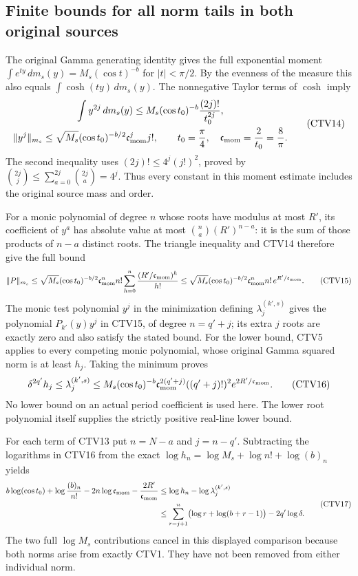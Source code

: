 \documentclass[11pt,a4paper]{article}
\begin{document}
\subsection{Finite bounds for all norm tails in both original sources}

The original Gamma generating identity gives the full exponential
moment
$\int e^{t y}\,dm_s(y)=M_s(\cos t)^{-b}$ for
$|t|<\pi/2$. By the evenness of the measure this also equals
$\int\cosh(t y)\,dm_s(y)$.
The nonnegative Taylor terms of $\cosh$ imply
\[
 \begin{gathered}
 \int y^{2j}\,dm_s(y)
  \le M_s(\cos t_0)^{-b}\frac{(2j)!}{t_0^{2j}},\\
 \|y^j\|_{m_s}
  \le\sqrt{M_s}(\cos t_0)^{-b/2}\mathfrak c_{\rm mom}^j j!,\qquad
 t_0=\frac\pi4,\quad \mathfrak c_{\rm mom}=\frac2{t_0}=\frac8\pi .
 \end{gathered}\tag{CTV14}
\]
The second inequality uses
$(2j)!\le4^j(j!)^2$, proved by
$\binom{2j}{j}\le\sum_{a=0}^{2j}\binom{2j}{a}=4^j$.
Thus every constant in this moment estimate includes the
original source mass and order.

For a monic polynomial of degree $n$ whose roots have modulus
at most $R'$, its coefficient of $y^a$ has absolute value at most
$\binom na(R')^{n-a}$: it is the sum of those products of
$n-a$ distinct roots. The triangle inequality and CTV14 therefore
give the full bound
\[
 \|P\|_{m_s}
  \le\sqrt{M_s}(\cos t_0)^{-b/2}
          \mathfrak c_{\rm mom}^n n!\sum_{h=0}^n
                              \frac{(R'/\mathfrak c_{\rm mom})^h}{h!}
  \le\sqrt{M_s}(\cos t_0)^{-b/2}
          \mathfrak c_{\rm mom}^n n!\,e^{R'/\mathfrak c_{\rm mom}}.
 \tag{CTV15}
\]
The monic test polynomial $y^j$ in the minimization defining
$\lambda_j^{(k',s)}$ gives the polynomial
$P_{k'}(y)y^j$ in CTV15, of degree $n=q'+j$; its extra
$j$ roots are exactly zero and also satisfy the stated bound.
For the lower bound, CTV5 applies to every competing monic
polynomial, whose original Gamma squared norm is at least
$h_j$. Taking the minimum proves
\[
 \delta^{2q'}h_j
 \le\lambda_j^{(k',s)}
 \le M_s(\cos t_0)^{-b}\mathfrak c_{\rm mom}^{2(q'+j)}
                ((q'+j)!)^2e^{2R'/\mathfrak c_{\rm mom}}.
 \tag{CTV16}
\]
No lower bound on an actual period coefficient is used here.
The lower root polynomial itself supplies the strictly positive
real-line lower bound.

For each term of CTV13 put $n=N-a$ and $j=n-q'$.
Subtracting the logarithms in CTV16 from the exact
$\log h_n=\log M_s+\log n!+\log(b)_n$ yields
\[
 \begin{split}
 b\log(\cos t_0)+\log\frac{(b)_n}{n!}
          -2n\log\mathfrak c_{\rm mom}
                         -\frac{2R'}{\mathfrak c_{\rm mom}}
 &\le \log h_n-\log\lambda_j^{(k',s)}\\
 &\le
   \sum_{r=j+1}^{n}\bigl(\log r+\log(b+r-1)\bigr)
                          -2q'\log\delta .
 \end{split}\tag{CTV17}
\]
The two full $\log M_s$ contributions cancel in this displayed
comparison because both norms arise from exactly CTV1.
They have not been removed from either individual norm.
\end{document}
